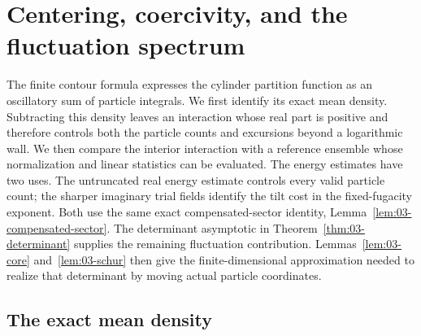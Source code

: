 \section{Centering, coercivity, and the fluctuation spectrum}\label{sec:03-gas-mean}

The finite contour formula expresses the cylinder partition function as
an oscillatory sum of particle integrals. We first identify its exact
mean density. Subtracting this density leaves an interaction whose real
part is positive and therefore controls both the particle counts and
excursions beyond a logarithmic wall. We then compare the interior
interaction with a reference ensemble whose normalization and linear
statistics can be evaluated. The energy estimates have two uses. The untruncated real energy estimate controls every valid particle count; the sharper imaginary trial fields identify the tilt cost in the fixed-fugacity exponent. Both use the same exact compensated-sector identity, Lemma~\ref{lem:03-compensated-sector}. The determinant asymptotic in Theorem~\ref{thm:03-determinant} supplies the remaining fluctuation contribution. Lemmas~\ref{lem:03-core} and~\ref{lem:03-schur} then give the finite-dimensional approximation needed to realize that determinant by moving actual particle coordinates.

\subsection{The exact mean density}

